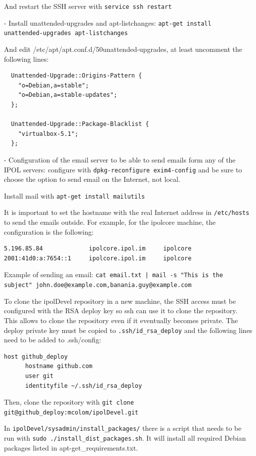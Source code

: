 \documentclass[a4paper,12pt]{article}
\begin{document}
And restart the SSH server with {\tt service ssh restart}

- Install unattended-upgrades and apt-listchanges: {\tt apt-get install unattended-upgrades apt-listchanges}

And edit /etc/apt/apt.conf.d/50unattended-upgrades, at least uncomment the following lines:
\begin{verbatim}
  Unattended-Upgrade::Origins-Pattern {
    "o=Debian,a=stable";
    "o=Debian,a=stable-updates";
  };

  Unattended-Upgrade::Package-Blacklist {
    "virtualbox-5.1";
  };
\end{verbatim}

- Configuration of the email server to be able to send emails form any of the IPOL servers: configure with {\tt dpkg-reconfigure exim4-config} and be sure to choose the option to send email on the Internet, not local.

Install mail with {\tt apt-get install mailutils}

It is important to set the hostname with the real Internet address in {\tt /etc/hosts} to send the emails outside. For example, for the ipolcore machine, the configuration is the following:

\begin{verbatim}
5.196.85.84             ipolcore.ipol.im     ipolcore
2001:41d0:a:7654::1     ipolcore.ipol.im     ipolcore
\end{verbatim}

Example of sending an email: {\tt cat email.txt | mail -s "This is the subject" john.doe@example.com,banania.guy@example.com}

To clone the ipolDevel repository in a new machine, the SSH access must be configured with the RSA deploy key so ssh can use it to clone the repository. This allows to clone the repository even if it eventually becomes private.
%
The deploy private key must be copied to {\tt .ssh/id\_rsa\_deploy} and the following lines need to be added to .ssh/config:

\begin{verbatim}
host github_deploy
      hostname github.com
      user git
      identityfile ~/.ssh/id_rsa_deploy
\end{verbatim}

Then, clone the repository with {\tt git clone git@github\_deploy:mcolom/ipolDevel.git}

In {\tt ipolDevel/sysadmin/install\_packages/} there is a script that needs to be run with {\tt sudo ./install\_dist\_packages.sh}. It will install all required Debian packages listed in apt-get\_requirements.txt.
\end{document}
